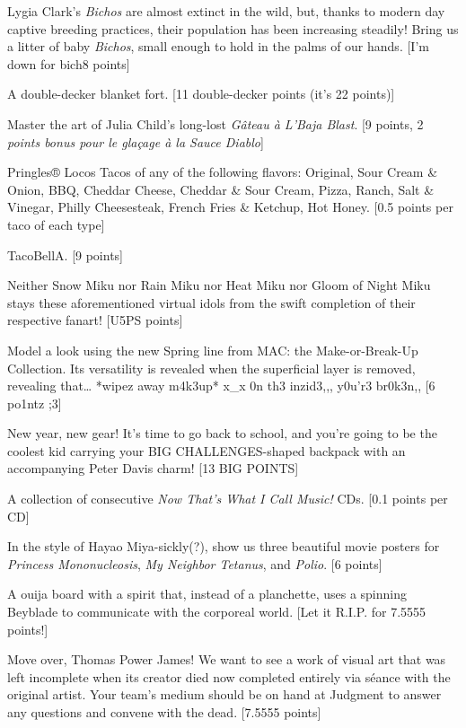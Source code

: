 \documentclass{book}
\begin{document}
\begin{list}{}{}
\item Lygia Clark’s \textit{Bichos} are almost extinct in the wild, but, thanks to modern day captive breeding practices, their population has been increasing steadily! Bring us a litter of baby \textit{Bichos}, small enough to hold in the palms of our hands. [I'm down for bich8 points]
\item A double-decker blanket fort. [11 double-decker points (it's 22 points)]
\item Master the art of Julia Child’s long-lost \textit{Gâteau à L’Baja Blast}. [9 points, 2 \textit{points bonus pour le glaçage à la Sauce Diablo}]
\item Pringles® Locos Tacos of any of the following flavors: Original, Sour Cream \& Onion, BBQ, Cheddar Cheese, Cheddar \& Sour Cream, Pizza, Ranch, Salt \& Vinegar, Philly Cheesesteak, French Fries \& Ketchup, Hot Honey. [0.5 points per taco of each type]
\item TacoBellA. [9 points] %
\item Neither Snow Miku nor Rain Miku nor Heat Miku nor Gloom of Night Miku stays these aforementioned virtual idols from the swift completion of their respective fanart! [U5PS points]
\item Model a look using the new Spring line from MAC: the Make-or-Break-Up Collection. Its versatility is revealed when the superficial layer is removed, revealing that… *wipez away m4k3up* x\_x 0n th3 inzid3,,, y0u’r3 br0k3n,, [6 po1ntz ;3]
\item New year, new gear! It’s time to go back to school, and you’re going to be the coolest kid carrying your BIG CHALLENGES-shaped backpack with an accompanying Peter Davis charm! [13 BIG POINTS]
\item A collection of consecutive \textit{Now That’s What I Call Music!} CDs. [0.1 points per CD]
\item In the style of Hayao Miya-sickly(?), show us three beautiful movie posters for \textit{Princess Mononucleosis}, \textit{My Neighbor Tetanus}, and \textit{Polio}. [6 points]
\item A ouija board with a spirit that, instead of a planchette, uses a spinning Beyblade to communicate with the corporeal world. [Let it R.I.P. for 7.5555 points!]
\newpage
\item Move over, Thomas Power James! We want to see a work of visual art that was left incomplete when its creator died now completed entirely via séance with the original artist. Your team's medium should be on hand at Judgment to answer any questions and convene with the dead. [7.5555 points]

\end{list}
\end{document}
